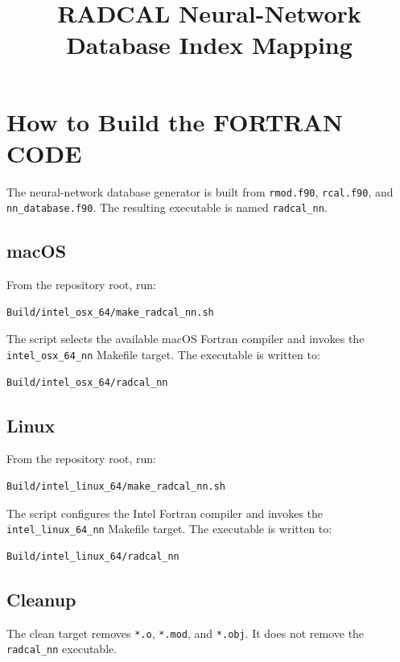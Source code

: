 \documentclass[11pt]{article}
\title{RADCAL Neural-Network Database Index Mapping}
\author{}
\date{}
\begin{document}
\maketitle

\section{How to Build the FORTRAN CODE}

The neural-network database generator is built from
\texttt{rmod.f90}, \texttt{rcal.f90}, and \texttt{nn\_database.f90}. The
resulting executable is named \texttt{radcal\_nn}.

\subsection{macOS}

From the repository root, run:

\begin{verbatim}
Build/intel_osx_64/make_radcal_nn.sh
\end{verbatim}

The script selects the available macOS Fortran compiler and invokes the
\texttt{intel\_osx\_64\_nn} Makefile target. The executable is written to:

\begin{verbatim}
Build/intel_osx_64/radcal_nn
\end{verbatim}

\subsection{Linux}

From the repository root, run:

\begin{verbatim}
Build/intel_linux_64/make_radcal_nn.sh
\end{verbatim}

The script configures the Intel Fortran compiler and invokes the
\texttt{intel\_linux\_64\_nn} Makefile target. The executable is written to:

\begin{verbatim}
Build/intel_linux_64/radcal_nn
\end{verbatim}

\subsection{Cleanup}

The clean target removes \texttt{*.o}, \texttt{*.mod}, and \texttt{*.obj}.
It does not remove the \texttt{radcal\_nn} executable.
\end{document}
